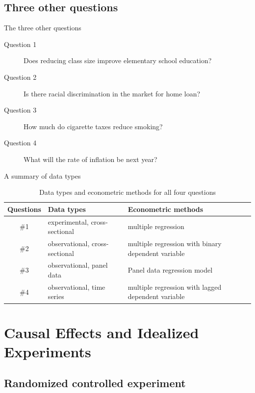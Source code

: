 \documentclass[presentation]{beamer}
\begin{document}
\subsection*{Three other questions}
\label{sec:org58c7dd5}

\begin{frame}[label={sec:orgb8a8ecf}]{The three other questions}
\begin{description}
\item[{Question 1}] Does reducing class size improve elementary school education?
\item[{Question 2}] Is there racial discrimination in the market for home loan?
\item[{Question 3}] How much do cigarette taxes reduce smoking?
\item[{Question 4}] What will the rate of inflation be next year?
\end{description}
\end{frame}

\begin{frame}[label={sec:org91373c4}]{A summary of data types}
\begin{table}[htbp]
\caption{\label{tab:org83b0e24}
Data types and econometric methods for all four questions}
\centering
\footnotesize
\begin{tabular}{clp{5cm}}
Questions & Data types & Econometric methods\\
\hline
\#1 & experimental, cross-sectional & multiple regression\\
\#2 & observational, cross-sectional & multiple regression with binary dependent variable\\
\#3 & observational, panel data & Panel data regression model\\
\#4 & observational, time series & multiple regression with lagged dependent variable\\
\end{tabular}
\end{table}
\end{frame}


\section{Causal Effects and Idealized Experiments}
\label{sec:org1dbaaab}
\setcounter{tocdepth}{1}
\tableofcontents[currentsection]

\subsection*{Randomized controlled experiment}
\label{sec:org0c9653f}
\end{document}
